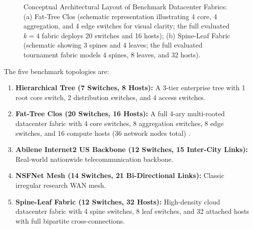 \documentclass[12pt,a4paper,oneside]{report}
\let\cite\citep
\begin{document}
\begin{figure}[htbp]
\caption{Conceptual Architectural Layout of Benchmark Datacenter Fabrics: (a) Fat-Tree Clos (schematic representation illustrating 4 core, 4 aggregation, and 4 edge switches for visual clarity; the full evaluated $k=4$ fabric deploys 20 switches and 16 hosts); (b) Spine-Leaf Fabric (schematic showing 3 spines and 4 leaves; the full evaluated tournament fabric models 4 spines, 8 leaves, and 32 hosts).}
\label{fig:benchmark_topos}
\end{figure}

The five benchmark topologies are:
\begin{enumerate}
    \item \textbf{Hierarchical Tree (7 Switches, 8 Hosts):} A 3-tier enterprise tree with 1 root core switch, 2 distribution switches, and 4 access switches.
    \item \textbf{Fat-Tree Clos (20 Switches, 16 Hosts):} A full 4-ary multi-rooted datacenter fabric with 4 core switches, 8 aggregation switches, 8 edge switches, and 16 compute hosts (36 network nodes total) \cite{al2008scalable}.
    \item \textbf{Abilene Internet2 US Backbone (12 Switches, 15 Inter-City Links):} Real-world nationwide telecommunication backbone.
    \item \textbf{NSFNet Mesh (14 Switches, 21 Bi-Directional Links):} Classic irregular research WAN mesh.
    \item \textbf{Spine-Leaf Fabric (12 Switches, 32 Hosts):} High-density cloud datacenter fabric with 4 spine switches, 8 leaf switches, and 32 attached hosts with full bipartite cross-connections.
\end{enumerate}
\end{document}
